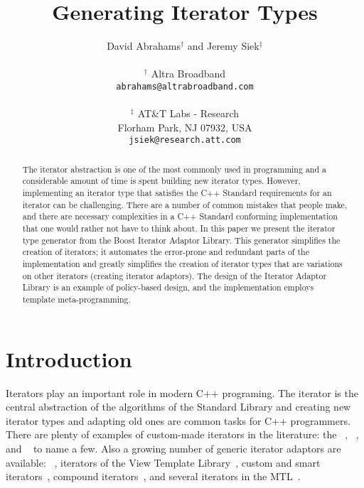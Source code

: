\documentclass{netobjectdays}
\begin{document}
\title{Generating Iterator Types}

\author{David Abrahams$^\dag$ and Jeremy Siek$^\ddag$ \\
\\
$^\dag$ Altra Broadband \\
\texttt{abrahams@altrabroadband.com}\\
\\
$^\ddag$ AT\&T Labs - Research \\
Florham Park, NJ 07932, USA \\
\texttt{jsiek@research.att.com}
}

\maketitle


\begin{abstract}
The iterator abstraction is one of the most commonly used in
programming and a considerable amount of time is spent building new
iterator types. However, implementing an iterator type that satisfies
the C++ Standard requirements for an iterator can be
challenging. There are a number of common mistakes that people make,
and there are necessary complexities in a C++ Standard conforming
implementation that one would rather not have to think about. In this
paper we present the iterator type generator from the Boost Iterator
Adaptor Library. This generator simplifies the creation of iterators;
it automates the error-prone and redundant parts of the implementation
and greatly simplifies the creation of iterator types that are
variations on other iterators (creating iterator adaptors).  The
design of the Iterator Adaptor Library is an example of policy-based
design, and the implementation employs template meta-programming.
\end{abstract}


\section{Introduction}


Iterators play an important role in modern C++ programing. The
iterator is the central abstraction of the algorithms of the Standard
Library and creating new iterator types and adapting old ones are
common tasks for C++ programmers. There are plenty of examples of
custom-made iterators in the literature: the
~\cite{austern99:_gener_progr_stl},
~\cite{koenig97:_rumin_cpp}, 
 and
~\cite{iso98:_cpp_final_draft_standard} to
name a few. Also a growing number of generic iterator adaptors are
available: ~\cite{stroustrup00:_cpp_prog_lang},
iterators of the View Template Library~\cite{TMPW00:Weiser}, custom
and smart iterators~\cite{becker98:_smart_iteraters,TMPW00:Baus},
compound iterators~\cite{alexandrescu98:_compound_iters}, and several
iterators in the MTL~\cite{siek99:_scitools}.
\end{document}
